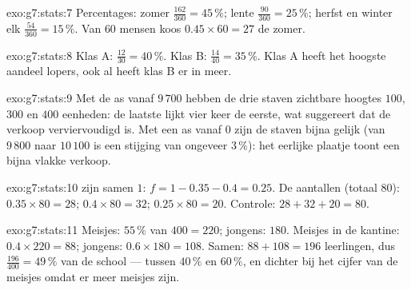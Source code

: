 \begin{solution}{exo:g7:stats:7}
Percentages: zomer $\frac{162}{360} = 45\,\%$; lente $\frac{90}{360} = 25\,\%$;
herfst en winter elk $\frac{54}{360} = 15\,\%$. Van $60$ mensen koos
$0.45 \times 60 = 27$ de zomer.
\end{solution}

\begin{solution}{exo:g7:stats:8}
Klas A: $\frac{12}{30} = 40\,\%$. Klas B: $\frac{14}{40} = 35\,\%$. Klas A heeft
het hoogste aandeel lopers, ook al heeft klas B er in  meer.
\end{solution}

\begin{solution}{exo:g7:stats:9}
Met de as vanaf $9\,700$ hebben de drie staven zichtbare hoogtes $100$, $300$ en
$400$ eenheden: de laatste lijkt vier keer de eerste, wat suggereert dat de verkoop
verviervoudigd is. Met een as vanaf $0$ zijn de staven bijna gelijk (van $9\,800$
naar $10\,100$ is een stijging van ongeveer $3\,\%$): het eerlijke plaatje toont een
bijna vlakke verkoop.
\end{solution}

\begin{solution}{exo:g7:stats:10}
 zijn samen $1$: $f = 1 - 0.35 - 0.4 = 0.25$. De aantallen (totaal
$80$): $0.35 \times 80 = 28$; $0.4 \times 80 = 32$; $0.25 \times 80 = 20$.
Controle: $28 + 32 + 20 = 80$.
\end{solution}

\begin{solution}{exo:g7:stats:11}
Meisjes: $55\,\%$ van $400 = 220$; jongens: $180$. Meisjes in de kantine:
$0.4 \times 220 = 88$; jongens: $0.6 \times 180 = 108$. Samen:
$88 + 108 = 196$ leerlingen, dus $\frac{196}{400} = 49\,\%$ van de school ---
tussen $40\,\%$ en $60\,\%$, en dichter bij het cijfer van de meisjes omdat er meer
meisjes zijn.
\end{solution}

